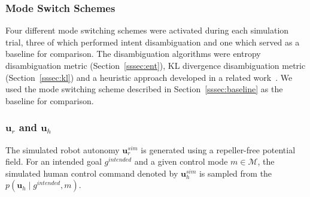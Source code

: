 \documentclass[conference]{IEEEtran}
\DeclareMathOperator*{\argmax}{argmax}
\begin{document}
\subsubsection{Mode Switch Schemes}
Four different mode switching schemes were activated during each simulation trial, three of which performed intent disambiguation and one which served as a baseline for comparison. The disambiguation algorithms were entropy disambiguation  metric (Section~\ref{sssec:ent}), KL divergence disambiguation metric (Section~\ref{sssec:kl}) and a heuristic approach developed in a related work~\citep{gopinath2017mode}. We used the mode switching scheme described in Section~\ref{sssec:baseline} as the baseline for comparison. 
\subsubsection{$\boldsymbol{u}_r$ and $\boldsymbol{u}_h$}
The simulated robot autonomy $\boldsymbol{u}^{sim}_r$ is generated using a repeller-free potential field. For an intended goal $g^{intended}$ and a given control mode $m \in \mathcal{M}$, the simulated human control command denoted by $\boldsymbol{u}^{sim}_h$ is sampled from the $p(\boldsymbol{u}_h\;|\;g^{intended}, m)$. 
\end{document}
